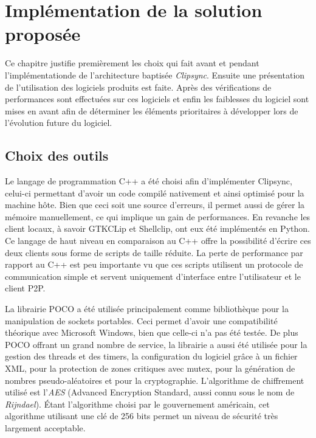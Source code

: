 \chapter{Implémentation de la solution proposée}
\renewcommand{\leftmark}{\thechapter.~~Implémentation de la solution proposée}
\label{chap:implem}
Ce chapitre justifie premièrement les choix qui fait avant et
pendant l'implémentationde de l'architecture baptisée \emph{Clipsync}.
Ensuite une présentation de l'utilisation des
logiciels produits est faite. Après des vérifications de performances sont
effectuées sur ces logiciels et enfin les faiblesses du logiciel sont mises
en avant afin de déterminer les éléments prioritaires à développer lors de
l'évolution future du logiciel.

\section{Choix des outils}
Le langage de programmation C++ a été choisi afin d'implémenter Clipsync,
celui-ci permettant d'avoir un code compilé nativement et ainsi optimisé
pour la machine hôte. Bien que ceci soit une source d'erreurs, il permet
aussi de gérer la mémoire manuellement, ce qui implique un gain de
performances. En revanche les client locaux, à savoir GTKCLip et Shellclip,
ont eux été implémentés en Python. Ce langage de haut niveau en comparaison
au C++ offre la possibilité d'écrire ces deux clients sous forme de scripts
de taille réduite. La perte de performance par rapport au C++ est peu
importante vu que ces scripts utilisent un protocole de communication simple
et servent uniquement d'interface entre l'utilisateur et le client P2P.

La librairie POCO\cite{poco} a été utilisée principalement comme bibliothèque
pour la manipulation de sockets portables. Ceci permet d'avoir une
compatibilité théorique avec Microsoft Windows, bien que celle-ci n'a pas
été testée. De plus POCO offrant un grand nombre de service, la librairie
a aussi été utilisée pour la gestion des threads et des timers, la
configuration du logiciel grâce à un fichier XML, pour la protection de
zones critiques avec mutex, pour la génération de
nombres pseudo-aléatoires et pour la cryptographie. L'algorithme de chiffrement
utilisé est l'\emph{AES}\cite{daemen2002the} (Advanced Encryption Standard,
aussi connu sous le nom de \emph{Rijndael}). Étant l'algorithme choisi par le
gouvernement américain, cet algorithme utilisant une clé de 256 bits permet un
niveau de sécurité très largement acceptable.

